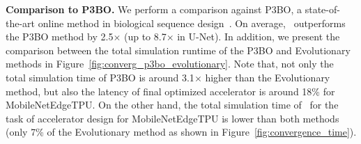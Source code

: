 \textbf{Comparison to P3BO.}
%
We perform a comparison against P3BO, a state-of-the-art online method in biological sequence design~\citep{p3bo:arxiv:2020}.
%
On average, \primemethodname\ outperforms the P3BO method by 2.5$\times$ (up to 8.7$\times$ in U-Net).
%
In addition, we present the comparison between the total simulation runtime of the P3BO and Evolutionary methods in Figure~\ref{fig:converg_p3bo_evolutionary}.
%
Note that, not only the total simulation time of P3BO is around 3.1$\times$ higher than the Evolutionary method, but also the latency of final optimized accelerator is around 18\% for MobileNetEdgeTPU.
%
On the other hand, the total simulation time of \primemethodname\ for the task of accelerator design for MobileNetEdgeTPU is lower than both methods (only 7\% of the Evolutionary method as shown in Figure~\ref{fig:convergence_time}).
%
\begin{table}[H]
\small
\centering
\vspace*{0.1cm}
\caption{Optimized objective values (i.e., latency in milliseconds) obtained by \primemethodname\ and P3BO~\citep{p3bo:arxiv:2020} when optimizing over single applications (MobileNetEdgeTPU, \mfour, t-RNN Dec, t-RNN Enc, and U-Net). On average, \primemethodname\ outperforms P3BO by 2.5$\times$.}
\label{table:p3bo_vs_prime}
\vspace{-0.1cm}
\end{table}
%
